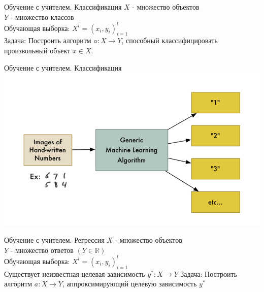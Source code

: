 \documentclass[10pt]{beamer}
\begin{document}
{
\begin{frame}{Обучение с учителем. Классификация }
	$X$ - множество объектов \\
	$Y$ - множество классов \\
	Обучающая выборка: ${X^l = (x_i, y_i)_{i=1}^l}$ \\ 
	\bigbreak
	\bigbreak
	\alert{Задача}: Построить алгоритм ${a \colon X \rightarrow Y}$, способный классифицировать произвольный объект ${x \in X}$.
\end{frame}
}

{
\begin{frame}{Обучение с учителем. Классификация}
  \centering
  \includegraphics[width=0.9 \linewidth, height=0.9 \textheight, keepaspectratio]{images/mnist}\\
\end{frame}
}

{
\begin{frame}{Обучение с учителем. Регрессия}
  $X$ - множество объектов \\
	$Y$ - множество ответов ${(Y \in \mathbb{R})}$\\
	Обучающая выборка: ${X^l = (x_i, y_i)_{i=1}^l}$ \\ 
	Существует неизвестная целевая зависимость $y^*: X \rightarrow Y$
	\bigbreak
	\bigbreak
	\alert{Задача}: Построить алгоритм ${a \colon X \rightarrow Y}$, аппроксимирующий целевую зависимость $y^*$
\end{frame}
}
\end{document}
